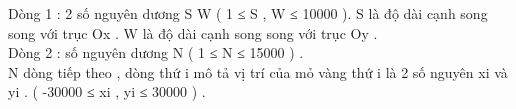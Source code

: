 Dòng 1 : 2 số nguyên dương S W ( 1 ≤ S , W ≤ 10000 ). S là độ dài cạnh song song với trục Ox . W là độ dài cạnh song song với trục Oy .   
\\   Dòng 2 : số nguyên dương N ( 1 ≤ N ≤ 15000 ) .   
\\   N dòng tiếp theo , dòng thứ i mô tả vị trí của mỏ vàng thứ i là 2 số nguyên xi và yi . ( -30000 ≤ xi , yi ≤ 30000 ) .  

\